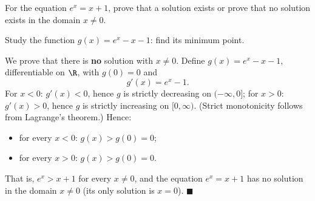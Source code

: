 
\begin{question}
For the equation $e^x=x+1$, prove that a solution exists or prove that no solution exists in the domain $x\neq0$.
\end{question}

\begin{hint}
Study the function $g(x)=e^x-x-1$: find its minimum point.
\end{hint}

\begin{solution}
We prove that there is \textbf{no} solution with $x\neq 0$. Define $g(x)=e^x-x-1$, differentiable on $\R$, with $g(0)=0$ and
\[ g'(x)=e^x-1. \]
For $x<0$: $g'(x)<0$, hence $g$ is strictly decreasing on $(-\infty,0]$; for $x>0$: $g'(x)>0$, hence $g$ is strictly increasing on $[0,\infty)$. (Strict monotonicity follows from Lagrange's theorem.) Hence:
\begin{itemize}
  \item for every $x<0$: $g(x)>g(0)=0$;
  \item for every $x>0$: $g(x)>g(0)=0$.
\end{itemize}
That is, $e^x>x+1$ for every $x\neq0$, and the equation $e^x=x+1$ has no solution in the domain $x\ne 0$ (its only solution is $x=0$). $\blacksquare$
\end{solution}
